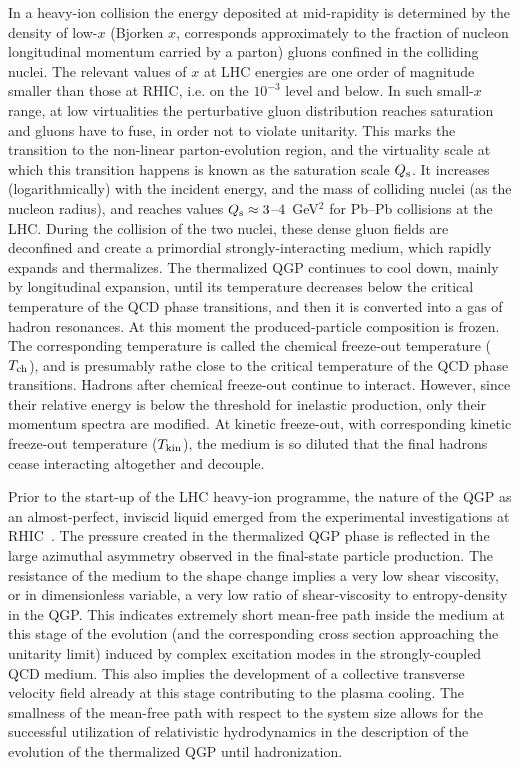 In a heavy-ion collision the energy deposited at mid-rapidity is determined by the density of low-$x$ (Bjorken $x$, corresponds approximately to the fraction of nucleon longitudinal momentum carried by a parton) gluons confined in the colliding nuclei. The relevant values of $x$ at LHC energies are one order of magnitude smaller than those at RHIC, i.e. on the $10^{-3}$ level and below. In such small-$x$ range, at low virtualities the perturbative gluon distribution reaches saturation and gluons have to fuse, in order not to violate unitarity.  This marks the transition to the non-linear parton-evolution region, and the virtuality scale at which this transition happens is known as the saturation scale $Q_{\rm s}$. It increases (logarithmically) with the incident energy, and the mass of colliding nuclei (as the nucleon radius), and  reaches values $Q_{\rm s} \approx 3$--$4$~GeV$^2$ for Pb--Pb collisions at the LHC. During the collision of the two nuclei, these dense gluon fields are deconfined and create a primordial strongly-interacting medium, which rapidly expands and thermalizes. The thermalized QGP continues to cool down, mainly by longitudinal expansion, until its temperature decreases below the critical temperature of the QCD phase transitions, and then it is converted into a gas of hadron resonances. At this moment the produced-particle composition is frozen. The corresponding temperature is called the chemical freeze-out temperature ($T_{\rm ch}$), and is presumably rathe close to the critical temperature of the QCD phase transitions. Hadrons after chemical freeze-out continue to interact. However, since their relative energy is below the threshold for inelastic production, only their momentum spectra are modified. At kinetic freeze-out, with corresponding kinetic freeze-out temperature ($T_{\rm kin}$), the medium is so diluted that the final hadrons cease interacting altogether and decouple.

Prior to the start-up of the LHC heavy-ion programme, the nature of the QGP as an almost-perfect, inviscid liquid emerged from the experimental investigations at RHIC~\cite{Tribble:2007nsac}. The pressure created in the thermalized QGP phase is reflected in the large azimuthal asymmetry observed in the final-state particle production. The resistance of the medium  to the shape change implies a very low shear viscosity, or in dimensionless variable, a very low ratio of shear-viscosity to entropy-density in the QGP. This indicates extremely short mean-free path inside the medium at this stage of the evolution (and the corresponding cross section approaching the unitarity limit) induced by complex excitation modes in the strongly-coupled QCD medium. This also implies the development of a collective transverse velocity field already at this stage contributing to the plasma cooling. The smallness of the mean-free path with respect to the system size allows for the successful utilization of relativistic hydrodynamics in the description of the evolution of the thermalized QGP until hadronization.


